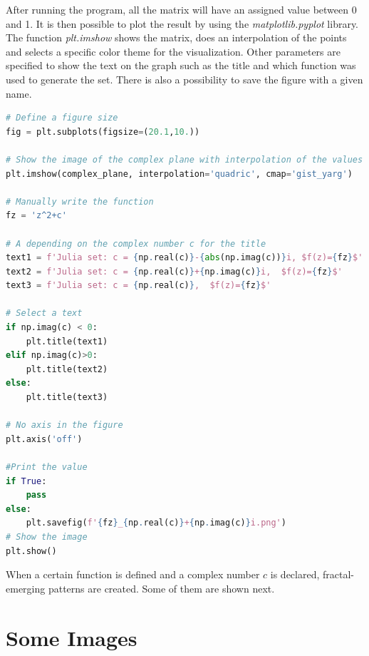 \documentclass{article}
\begin{document}
After running the program, all the matrix will have an assigned value between 0 and 1. It is then possible to plot the result by using the \textit{matplotlib.pyplot} library. The function \textit{plt.imshow} shows the matrix, does an interpolation of the points and selects a specific color theme for the visualization.
Other parameters are specified to show the text on the graph such as the title and which function was used to generate the set. There is also a possibility to save the figure with a given name.

\begin{lstlisting}[language = Python, frame = single]
# Define a figure size
fig = plt.subplots(figsize=(20.1,10.))

# Show the image of the complex plane with interpolation of the values
plt.imshow(complex_plane, interpolation='quadric', cmap='gist_yarg')

# Manually write the function
fz = 'z^2+c'

# A depending on the complex number c for the title
text1 = f'Julia set: c = {np.real(c)}-{abs(np.imag(c))}i, $f(z)={fz}$'
text2 = f'Julia set: c = {np.real(c)}+{np.imag(c)}i,  $f(z)={fz}$'
text3 = f'Julia set: c = {np.real(c)},  $f(z)={fz}$'

# Select a text 
if np.imag(c) < 0:
    plt.title(text1)
elif np.imag(c)>0:    
    plt.title(text2)
else:
    plt.title(text3)
    
# No axis in the figure
plt.axis('off')

#Print the value 
if True:
    pass
else:
    plt.savefig(f'{fz}_{np.real(c)}+{np.imag(c)}i.png')
# Show the image
plt.show()
\end{lstlisting}

When a certain function is defined and a complex number $c$ is declared, fractal-emerging patterns are created. Some of them are shown next.

\newpage
\section{Some Images}
\end{document}
